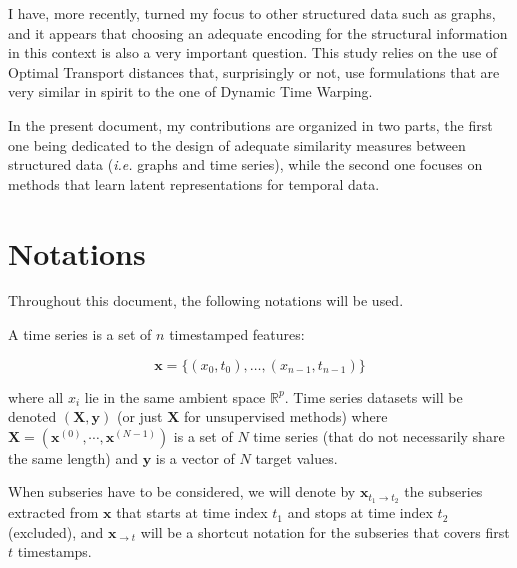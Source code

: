 I have, more recently, turned my focus to other structured data such as graphs,
and it appears that choosing an adequate encoding for the structural information
in this context is also a very important question.
This study relies on the use of Optimal Transport distances that, surprisingly
or not, use formulations that are very similar in spirit to the one of
Dynamic Time Warping.

In the present document, my contributions are organized in two
parts, the first one being dedicated to the design of adequate similarity
measures between structured data (\emph{i.e.} graphs and time series), while the
second one focuses on methods that
learn latent representations for temporal data.

\section*{Notations}

Throughout this document, the following notations will be used.

A time series is a set of $n$ timestamped features:

\begin{equation}
    \mathbf{x} = \{ (x_0, t_0), \dots , (x_{n-1}, t_{n-1}) \}
\end{equation}

where all $x_i$ lie in the same ambient space $\mathbb{R}^{p}$.
Time series datasets will be denoted $(\mathbf{X}, \mathbf{y})$ (or just
$\mathbf{X}$ for unsupervised methods) where
$\mathbf{X} = \left( \mathbf{x}^{(0)}, \cdots, \mathbf{x}^{(N-1)} \right)$ is
a set of $N$ time series (that do not necessarily share the same length) and
$\mathbf{y}$ is a vector of $N$ target values.

When subseries have to be considered, we will denote by
$\mathbf{x}_{t_1 \rightarrow t_2}$ the subseries extracted from $\mathbf{x}$
that starts at time index $t_1$ and stops at time index $t_2$ (excluded), and
$\mathbf{x}_{\rightarrow t}$ will be a shortcut notation for the subseries that
covers first $t$ timestamps.
